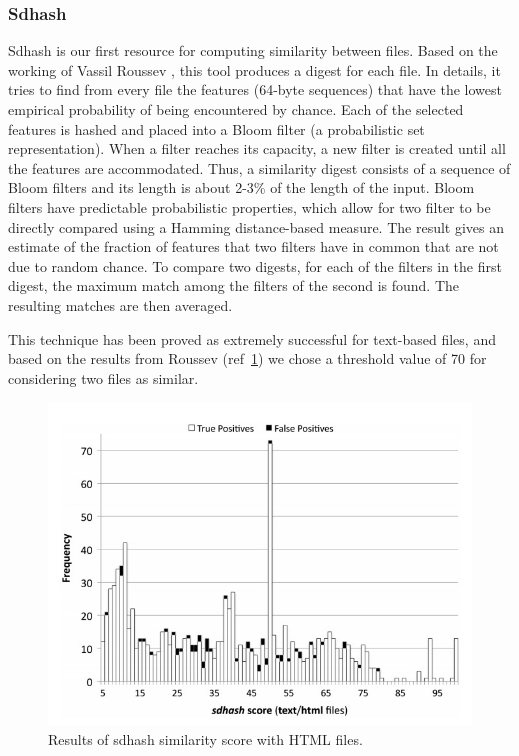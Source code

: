 \subsubsection{Sdhash}
Sdhash is our first resource for computing similarity between files. Based on the working of Vassil Roussev \cite{sdhash}, this tool produces a digest for each file. In details, it tries to find from every file the features (64-byte sequences) that have the lowest empirical probability of being encountered by chance. Each of the selected features is hashed and placed into a Bloom filter (a probabilistic set representation). When a filter reaches its capacity, a new filter is created until all the features are accommodated. Thus, a similarity digest consists of a sequence of Bloom filters and its length is about 2-3\% of the length of the input. Bloom filters have predictable probabilistic properties, which allow for two filter to be directly compared using a Hamming distance-based measure. The result gives an estimate of the fraction of features that two filters have in common that are not due to random chance.
To compare two digests, for each of the filters in the first digest, the maximum match among the filters of the second is found. The resulting matches are then averaged.

This technique has been proved as extremely successful for text-based files, and based on the results from Roussev (ref~\ref{fig:sdhash_tp_fp}) we chose a threshold value of 70 for considering two files as similar.

\begin{figure}[tbh]
\centerline{\includegraphics[scale=1]{Images/sdhash_TP_FP.jpg}}
\caption{Results of sdhash similarity score with HTML files.\label{fig:sdhash_tp_fp}}
\end{figure}

